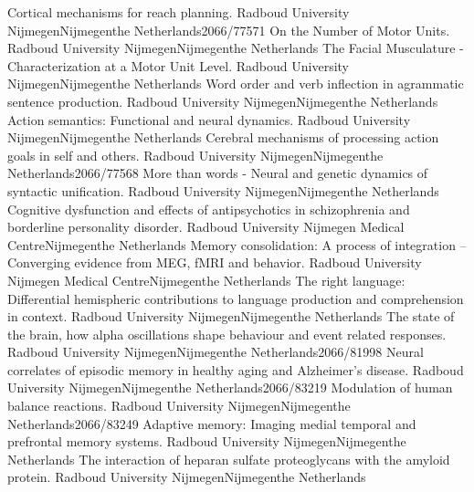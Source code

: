 	{Cortical mechanisms for reach planning.}
	{Radboud University Nijmegen}{Nijmegen}{the Netherlands}{2066/77571}
	{On the Number of Motor Units.}
	{Radboud University Nijmegen}{Nijmegen}{the Netherlands}{}
	{The Facial Musculature - Characterization at a Motor Unit Level.}
	{Radboud University Nijmegen}{Nijmegen}{the Netherlands}{}
	{Word order and verb inflection in agrammatic sentence production.}
	{Radboud University Nijmegen}{Nijmegen}{the Netherlands}{}
	{Action semantics: Functional and neural dynamics.}
	{Radboud University Nijmegen}{Nijmegen}{the Netherlands}{}
	{Cerebral mechanisms of processing action goals in self and others.}
	{Radboud University Nijmegen}{Nijmegen}{the Netherlands}{2066/77568}
	{More than words - Neural and genetic dynamics of syntactic unification.}
	{Radboud University Nijmegen}{Nijmegen}{the Netherlands}{}
	{Cognitive dysfunction and effects of antipsychotics in schizophrenia and borderline personality disorder.}
	{Radboud University Nijmegen Medical Centre}{Nijmegen}{the Netherlands}{}
	{Memory consolidation: A process of integration – Converging evidence from MEG, fMRI and behavior.}
	{Radboud University Nijmegen Medical Centre}{Nijmegen}{the Netherlands}{}
	{The right language: Differential hemispheric contributions to language production and comprehension in context.}
	{Radboud University Nijmegen}{Nijmegen}{the Netherlands}{}
	{The state of the brain, how alpha oscillations shape behaviour and event related responses.}
	{Radboud University Nijmegen}{Nijmegen}{the Netherlands}{2066/81998}
	{Neural correlates of episodic memory in healthy aging and Alzheimer’s disease.}
	{Radboud University Nijmegen}{Nijmegen}{the Netherlands}{2066/83219}
	{Modulation of human balance reactions.}
	{Radboud University Nijmegen}{Nijmegen}{the Netherlands}{2066/83249}
	{Adaptive memory: Imaging medial temporal and prefrontal memory systems.}
	{Radboud University Nijmegen}{Nijmegen}{the Netherlands}{}
	{The interaction of heparan sulfate proteoglycans with the amyloid protein.}
	{Radboud University Nijmegen}{Nijmegen}{the Netherlands}{}

